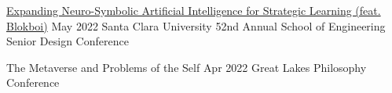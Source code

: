 \vspace{\sectionpadding}
\entry
    {\href{https://www.scu.edu/engineering/undergraduate/senior-design/archives/2022-senior-design/}{Expanding Neuro-Symbolic Artificial Intelligence for Strategic Learning (feat. Blokboi)}}
    {}
    {May 2022}
    {Santa Clara University 52nd Annual School of Engineering Senior Design Conference}


\entry
    {The Metaverse and Problems of the Self}
    {}
    {Apr 2022}
    {Great Lakes Philosophy Conference}

